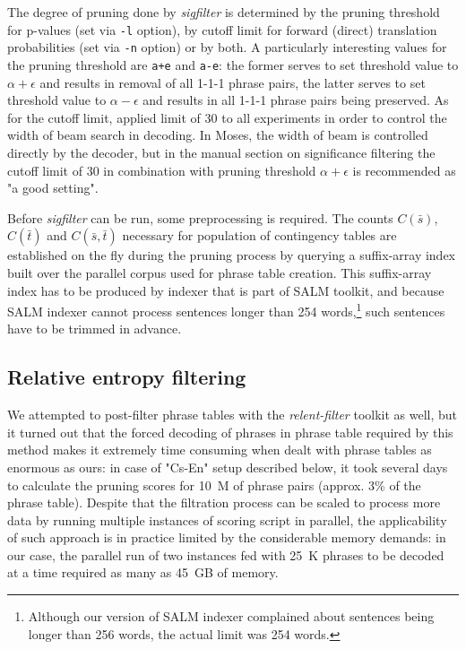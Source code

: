 The degree of pruning done by \emph{sigfilter} is determined by the pruning
threshold for p-values (set via \verb|-l| option), by cutoff limit for forward
(direct) translation probabilities (set via \verb|-n| option) or by both.
A particularly interesting values for the pruning threshold are \verb|a+e| and
\verb|a-e|: the former serves to set threshold value to $\alpha + \epsilon$ and
results in removal of all 1-1-1 phrase pairs, the latter serves to set threshold
value to $\alpha - \epsilon$ and results in all 1-1-1 phrase pairs being preserved.
As for the cutoff limit, \citet{johnson:sigfilter} applied limit of 30 to all
experiments in order to control the width of beam search in decoding.
In Moses, the width of beam is controlled directly by the decoder, but
in the manual section on significance filtering the cutoff limit of 30
in combination with pruning threshold $\alpha + \epsilon$ is recommended as
"a good setting".

Before \emph{sigfilter} can be run, some preprocessing is required.
The counts $C(\bar{s})$, $C(\bar{t})$ and $C(\bar{s},\bar{t})$ necessary for
population of contingency tables are established on the fly during the
pruning process by querying a suffix-array index built over the parallel
corpus used for phrase table creation.
This suffix-array index has to be produced by indexer that is part of SALM
toolkit,
and because SALM indexer cannot process sentences longer than 254 words,\footnote{Although
our version of SALM indexer complained about sentences being longer than 256 words,
the actual limit was 254 words.} such sentences have to be trimmed in advance.

\subsection{Relative entropy filtering}

We attempted to post-filter phrase tables with the \emph{relent-filter} toolkit as well,
but it turned out that the forced decoding of phrases in phrase table required by this
method makes it extremely time consuming when dealt with phrase tables as enormous as ours:
in case of "Cs-En" setup described below, it took several days to calculate the pruning
scores for 10~M of phrase pairs (approx. 3\% of the phrase table). %
Despite that the filtration process can be scaled to process more data by running multiple
instances of scoring script in parallel, the applicability of such approach is in practice
limited by the considerable memory demands: in our case, the parallel run of two instances
fed with 25~K phrases to be decoded at a time required as many as 45~GB of memory.

